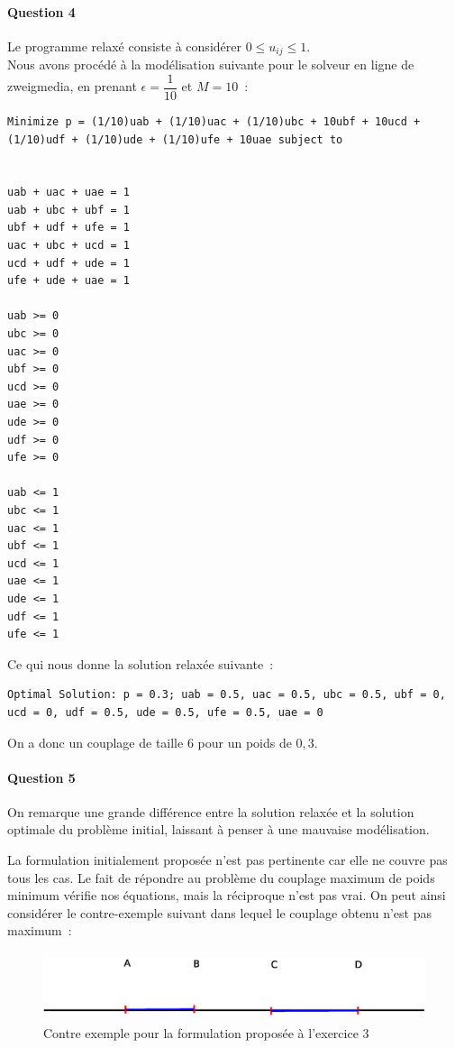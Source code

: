 \paragraph{Question 4}
Le programme relaxé consiste à considérer $0 \leq u_{ij} \leq 1$. \\
Nous avons procédé à la modélisation suivante pour le solveur en ligne
de zweigmedia, en prenant $\epsilon = \dfrac{1}{10}$ et $M=10$~:
\begin{lstlisting}
Minimize p = (1/10)uab + (1/10)uac + (1/10)ubc + 10ubf + 10ucd +
(1/10)udf + (1/10)ude + (1/10)ufe + 10uae subject to


uab + uac + uae = 1 
uab + ubc + ubf = 1 
ubf + udf + ufe = 1 
uac + ubc + ucd = 1 
ucd + udf + ude = 1
ufe + ude + uae = 1 

uab >= 0
ubc >= 0
uac >= 0
ubf >= 0
ucd >= 0
uae >= 0
ude >= 0
udf >= 0
ufe >= 0

uab <= 1
ubc <= 1
uac <= 1
ubf <= 1
ucd <= 1
uae <= 1
ude <= 1
udf <= 1
ufe <= 1
\end{lstlisting}

Ce qui nous donne la solution relaxée suivante~:
\begin{lstlisting}
Optimal Solution: p = 0.3; uab = 0.5, uac = 0.5, ubc = 0.5, ubf = 0,
ucd = 0, udf = 0.5, ude = 0.5, ufe = 0.5, uae = 0
\end{lstlisting}
On a donc un couplage de taille $6$ pour un poids de $0,3$.

\paragraph{Question 5}
On remarque une grande différence entre la solution relaxée et la
solution optimale du problème initial, laissant à penser à une
mauvaise modélisation.


La formulation initialement proposée n'est pas pertinente car elle ne
couvre pas tous les cas. Le fait de répondre au problème du couplage
maximum de poids minimum vérifie nos équations, mais la réciproque
n'est pas vrai. On peut ainsi considérer le contre-exemple suivant
dans lequel le couplage obtenu n'est pas maximum~:
\begin{figure}[!ht]
\begin{center}
\includegraphics[height=2cm]{exo3.eps}
\end{center}
\caption{Contre exemple pour la formulation proposée à l'exercice 3}
\end{figure}
